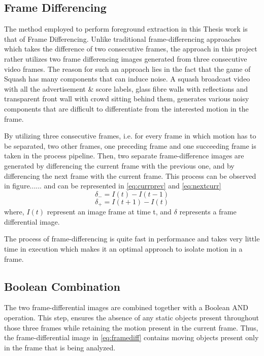 \documentclass[a4paper]{article}
\begin{document}
\subsection{Frame Differencing}
The method employed to perform foreground extraction in this Thesis work is that of Frame Differencing. Unlike traditional frame-differencing approaches which takes the difference of two consecutive frames, the approach in this project rather utilizes two frame differencing images generated from three consecutive video frames. The reason for such an approach lies in the fact that the game of Squash has many components that can induce noise. A squash broadcast video with all the advertisement \& score labels, glass fibre walls with reflections and transparent front wall with crowd sitting behind them, generates various noisy components that are difficult to differentiate from the interested motion in the frame. \par 
By utilizing three consecutive frames, i.e. for every frame in which motion has to be separated, two other frames, one preceding frame and one succeeding frame is taken in the process pipeline. Then, two separate frame-difference images are generated by differencing the current frame with the previous one, and by differencing the next frame with the current frame. This process can be observed in figure...... and can be represented in \autoref{eq:currprev} and \autoref{eq:nextcurr}
\begin{equation} \label{eq:currprev}
    \delta_- = I(t) - I(t-1) 
\end{equation} 
\begin{equation} \label{eq:nextcurr}
    \delta_+ = I(t+1) - I(t)
\end{equation}
where, $I(t)$ represent an image frame at time t, and $\delta$ represents a frame differential image.
\par
The process of frame-differencing is quite fast in performance and takes very little time in execution which makes it an optimal approach to isolate motion in a frame.
\par

\subsection{Boolean Combination}
The two frame-differential images are combined together with a Boolean AND operation. This step, ensures the absence of any static objects present throughout those three frames while retaining the motion present in the current frame. Thus, the frame-differential image in \autoref{eq:framediff} contains moving objects present only in the frame that is being analyzed. 
\par
\end{document}
